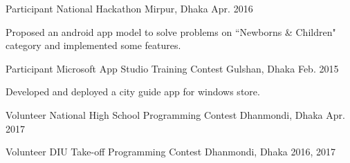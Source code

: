 

\begin{cventries}


  \cventry
    {Participant} %
    {National Hackathon} %
    {Mirpur, Dhaka} %
    {Apr. 2016} %
    {
      \begin{cvitems} %
        \item {Proposed an android app model to solve problems on ``Newborns \& Children" category and implemented some features.}
      \end{cvitems}
    }

  \cventry
    {Participant} %
    {Microsoft App Studio Training Contest} %
    {Gulshan, Dhaka} %
    {Feb. 2015} %
    {
      \begin{cvitems} %
        \item {Developed and deployed a city guide app for windows store.}
      \end{cvitems}
    }

  \cventry
    {Volunteer} %
    {National High School Programming Contest} %
    {Dhanmondi, Dhaka} %
    {Apr. 2017} %
    {}


  \cventry
    {Volunteer} %
    {DIU Take-off Programming Contest} %
    {Dhanmondi, Dhaka} %
    {2016, 2017} %
    {}






\end{cventries}
